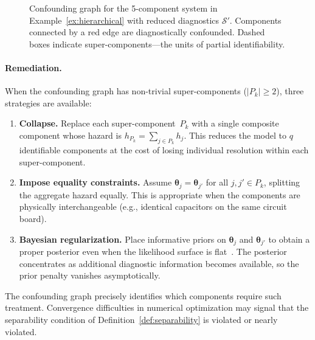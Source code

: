 \documentclass[11pt]{article}
\theoremstyle{definition}
\theoremstyle{plain}
\renewcommand{\v}[1]{\boldsymbol{#1}}
\begin{document}
\begin{figure}[t]
\centering
{}
\caption{Confounding graph for the 5-component system in
Example~\ref{ex:hierarchical} with reduced diagnostics
$\mathcal{S}'$.
Components connected by a red edge are diagnostically confounded.
Dashed boxes indicate super-components---the units of partial
identifiability.}
\label{fig:confounding-graph}
\end{figure}

\paragraph{Remediation.}
When the confounding graph has non-trivial super-components
($|P_k| \geq 2$), three strategies are available:
\begin{enumerate}
    \item \textbf{Collapse.}
    Replace each super-component~$P_k$ with a single composite
    component whose hazard is $h_{P_k} = \sum_{j \in P_k} h_j$.
    This reduces the model to $q$ identifiable components at the
    cost of losing individual resolution within each super-component.
    \item \textbf{Impose equality constraints.}
    Assume $\v{\theta}_j = \v{\theta}_{j'}$ for all
    $j, j' \in P_k$, splitting the aggregate hazard equally.
    This is appropriate when the components are physically
    interchangeable (e.g., identical capacitors on the same circuit
    board).
    \item \textbf{Bayesian regularization.}
    Place informative priors on $\v{\theta}_j$ and $\v{\theta}_{j'}$
    to obtain a proper posterior even when the likelihood surface is
    flat~\citep[see][for Gibbs sampling under masked series system
    likelihoods]{kuo2000}.
    The posterior concentrates as additional diagnostic information
    becomes available, so the prior penalty vanishes asymptotically.
\end{enumerate}
The confounding graph precisely identifies which components require
such treatment.
Convergence difficulties in numerical optimization may signal that
the separability condition of Definition~\ref{def:separability} is
violated or nearly violated.
\end{document}
